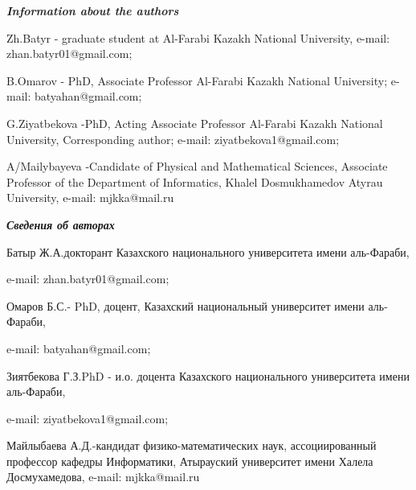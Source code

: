\emph{{\bfseries Information about the authors}}

\begin{noparindent}
Zh.Batyr - graduate student at Al-Farabi Kazakh National University,
e-mail: zhan.batyr01@gmail.com;

B.Omarov - PhD, Associate Professor Al-Farabi Kazakh National
University; e-mail: batyahan@gmail.com;

G.Ziyatbekova -PhD, Acting Associate Professor Al-Farabi Kazakh National
University, Corresponding author; e-mail: ziyatbekova1@gmail.com;

A/Mailybayeva -Candidate of Physical and Mathematical Sciences,
Associate Professor of the Department of Informatics, Khalel
Dosmukhamedov Atyrau University, e-mail: mjkka@mail.ru
\end{noparindent}

\emph{{\bfseries Сведения об авторах}}

\begin{noparindent}
Батыр Ж.А.докторант Казахского национального университета имени
аль-Фараби,

e-mail: zhan.batyr01@gmail.com;

Омаров Б.С.- PhD, доцент, Казахский национальный университет имени
аль-Фараби,

e-mail: batyahan@gmail.com;

Зиятбекова Г.З.PhD - и.о. доцента Казахского национального университета
имени аль-Фараби,

e-mail: ziyatbekova1@gmail.com;

Майлыбаева А.Д.-кандидат физико-математических наук, ассоциированный
профессор кафедры Информатики, Атырауский университет имени Халела
Досмухамедова, e-mail: mjkka@mail.ru
\end{noparindent}
